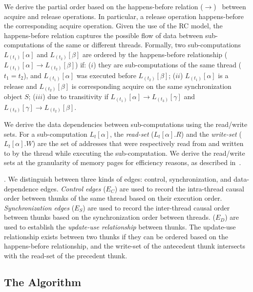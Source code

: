 We derive the partial order based on the happens-before relation
($\rightarrow$)~\cite{djit,fast-track-pldi} between acquire and release operations. In particular, a release
operation happens-before the corresponding acquire operation. Given
the use of the RC model, the happens-before relation
captures the possible flow of data between sub-computations of the same or different threads.
Formally, two sub-computations $L_{(t_1)}[\alpha]$ and
$L_{(t_2)}[\beta]$ are ordered by the happens-before relationship ($L_{(t_1)}[\alpha] \rightarrow
L_{(t_2)}[\beta]$) if:  ($i$)  they are sub-computations of the
same thread ($t_1 = t_2$), and $L_{(t_1)}[\alpha]$ was executed before $L_{(t_2)}[\beta]$; ($ii$)  $L_{(t_1)}[\alpha]$  is a release and $L_{(t_2)}[\beta]$ is corresponding acquire on the same synchronization object $S$; ($iii$) due to transitivity if
 $L_{(t_1)}[\alpha] \rightarrow L_{(t_3)}[\gamma] $ and $L_{(t_3)}[\gamma]  \rightarrow L_{(t_2)}[\beta]$.


 We derive the data dependencies between sub-computations using the read/write sets. For a sub-computation $L_t[\alpha]$, the {\em read-set}
($L_t[\alpha].R$) and the {\em write-set} ($L_t[\alpha].W$) are the set of
addresses that were respectively read from and written to by
the thread while executing the sub-computation. We derive the read/write sets at the granularity of memory pages for efficiency reasons, as described in~.

.
We distinguish between three kinds of edges: control, synchronization, and data-dependence edges.
{\em Control edges} ($E_{C}$) are used to record the intra-thread causal order between thunks of the same thread
based on their execution order. {\em Synchronization edges}  ($E_{S}$) are
used to record the inter-thread causal order between thunks based on the synchronization order between threads. ($E_{D}$) are used to establish the {\em update-use relationship} between thunks. The update-use relationship exists between two thunks if they can be  ordered based on the happens-before relationship, and the write-set of the  antecedent thunk intersects with the read-set of the precedent thunk.





 \subsection{ The Algorithm}




